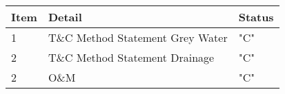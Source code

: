 \begin{tabular}{lll}
\toprule
Item &  Detail & Status \\
\midrule
1    & T\&C Method Statement Grey Water & "C"\\
2    & T\&C Method Statement Drainage & "C"\\
2    & O\&M                  & "C" \\
\bottomrule
\end{tabular}

















        





